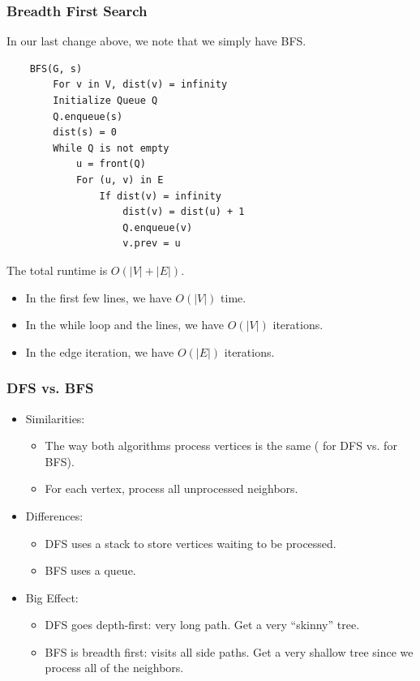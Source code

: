 \documentclass[letterpaper]{article}
\begin{document}
\subsubsection{Breadth First Search}
In our last change above, we note that we simply have BFS.
\begin{verbatim}
    BFS(G, s)
        For v in V, dist(v) = infinity 
        Initialize Queue Q
        Q.enqueue(s)
        dist(s) = 0
        While Q is not empty
            u = front(Q)
            For (u, v) in E
                If dist(v) = infinity
                    dist(v) = dist(u) + 1
                    Q.enqueue(v)
                    v.prev = u
\end{verbatim}
The total runtime is $O(|V| + |E|)$.
\begin{itemize}
    \item In the first few lines, we have $O(|V|)$ time.
    \item In the while loop and the  lines, we have $O(|V|)$ iterations. 
    \item In the edge iteration, we have $O(|E|)$ iterations. 
\end{itemize}

\subsubsection{DFS vs. BFS}
\begin{itemize}
    \item Similarities:
    \begin{itemize}
        \item The way both algorithms process vertices is the same ( for DFS vs.  for BFS).
        \item For each vertex, process all unprocessed neighbors.
    \end{itemize}
    \item Differences:
    \begin{itemize}
        \item DFS uses a stack to store vertices waiting to be processed. 
        \item BFS uses a queue.
    \end{itemize}
    \item Big Effect:
    \begin{itemize}
        \item DFS goes depth-first: very long path. Get a very ``skinny'' tree. 
        \item BFS is breadth first: visits all side paths. Get a very shallow tree since we process all of the neighbors.
    \end{itemize}
\end{itemize}
\end{document}
